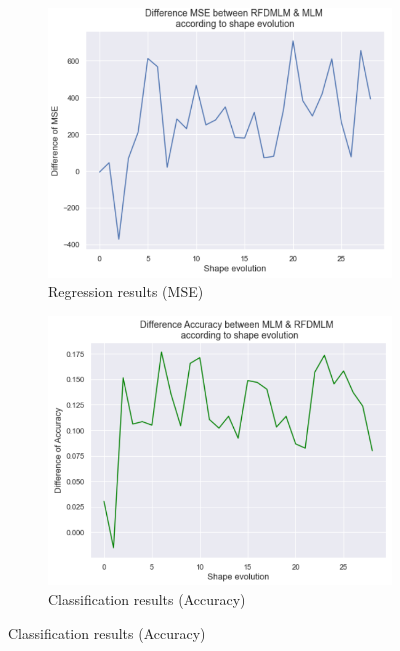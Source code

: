 \documentclass[12pt,a4paper]{report}
\begin{document}
\begin{figure}[!h]
    \centering
    \begin{subfigure}[b]{0.45\textwidth}
        \includegraphics[width=\textwidth]{shapeEvo_r.png}
         \caption{Regression results (MSE)}

    \end{subfigure}
    \begin{subfigure}[b]{0.46\textwidth}
        \includegraphics[width=\textwidth]{shapeEvo_c.png}
        \caption{Classification results (Accuracy)}
    \end{subfigure}
\end{figure}
\end{document}
